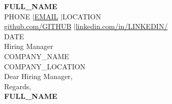 \documentclass[10pt,letterpaper]{article}
\begin{document}
\enlargethispage{2\baselineskip}

\noindent
\textbf{\Large FULL\_NAME} \\[0.2em]
\noindent
PHONE \enspace$|$\enspace \href{mailto:EMAIL}{EMAIL} \enspace$|$\enspace LOCATION \\
\href{https://github.com/GITHUB}{github.com/GITHUB} \enspace$|$\enspace \href{https://www.linkedin.com/in/LINKEDIN/}{linkedin.com/in/LINKEDIN/} \\[1em]

\noindent
DATE \\[1em]

\noindent
Hiring Manager \\
COMPANY\_NAME \\
COMPANY\_LOCATION \\[1em]

\noindent
Dear Hiring Manager, \\[0.6em]






\vspace{0.5em}
\noindent
Regards, \\[0.8em]

\noindent
\textbf{FULL\_NAME}
\end{document}
